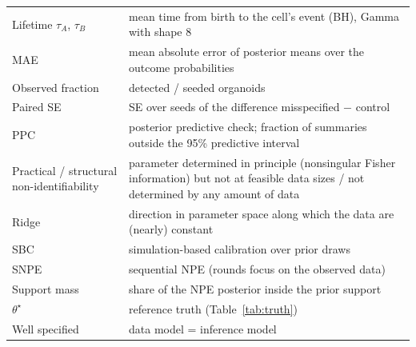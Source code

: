 \documentclass[10pt,a4paper]{article}
\newcommand{\tA}{$\tau_A$}
\newcommand{\tB}{$\tau_B$}
\begin{document}
\begin{center}
\begin{tabularx}{\linewidth}{@{}p{3.3cm}X@{}}
Lifetime \tA, \tB & mean time from birth to the cell's event (BH), Gamma with shape 8 \\
MAE & mean absolute error of posterior means over the outcome probabilities \\
Observed fraction & detected / seeded organoids \\
Paired SE & SE over seeds of the difference misspecified $-$ control \\
PPC & posterior predictive check; fraction of summaries outside the 95\% predictive interval \\
Practical / structural non-identifiability & parameter determined in principle (nonsingular Fisher information) but not at feasible data sizes / not determined by any amount of data \\
Ridge & direction in parameter space along which the data are (nearly) constant \\
SBC & simulation-based calibration over prior draws \\
SNPE & sequential NPE (rounds focus on the observed data) \\
Support mass & share of the NPE posterior inside the prior support \\
$\theta^\star$ & reference truth (Table~\ref{tab:truth}) \\
Well specified & data model = inference model \\\bottomrule
\end{tabularx}
\end{center}
\end{document}
